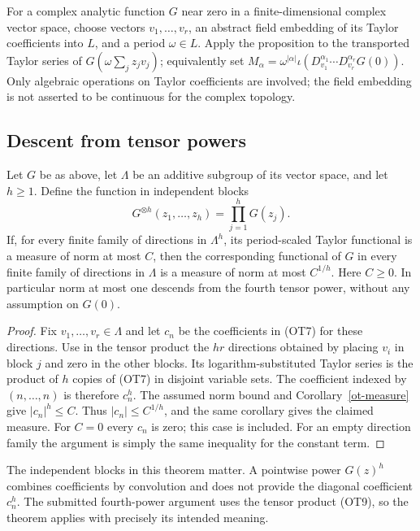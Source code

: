 For a complex analytic function $G$ near zero in a finite-dimensional
complex vector space, choose vectors $v_1,\ldots,v_r$, an abstract
field embedding of its Taylor coefficients into $L$, and a period
$\omega\in L$.  Apply the proposition to the transported Taylor
series of $G(\omega\sum_j z_jv_j)$; equivalently set
$M_\alpha=\omega^{|\alpha|}\iota(D_{v_1}^{\alpha_1}
\cdots D_{v_r}^{\alpha_r}G(0))$.
Only algebraic operations on Taylor coefficients are involved; the
field embedding is not asserted to be continuous for the complex
topology.

\subsection{Descent from tensor powers}

\begin{theorem}\label{ot-tensor-root}
Let $G$ be as above, let $\Lambda$ be an additive subgroup of its
vector space, and let $h\ge1$.  Define the function in independent
blocks
\[
             G^{\otimes h}(z_1,\ldots,z_h)
                      =\prod_{j=1}^hG(z_j).
 \tag{OT9}
\]
If, for every finite family of directions in $\Lambda^h$, its
period-scaled Taylor functional is a measure of norm at most $C$,
then the corresponding functional of $G$ in every finite family
of directions in $\Lambda$ is a measure of norm at most $C^{1/h}$.
Here $C\ge0$.  In particular norm at most one descends from the
fourth tensor power, without any assumption on $G(0)$.
\end{theorem}
\begin{proof}
Fix $v_1,\ldots,v_r\in\Lambda$ and let $c_n$ be the coefficients
in (OT7) for these directions.  Use in the tensor product the
$hr$ directions obtained by placing $v_i$ in block $j$ and zero
in the other blocks.  Its logarithm-substituted Taylor series is
the product of $h$ copies of (OT7) in disjoint variable sets.
The coefficient indexed by $(n,\ldots,n)$ is therefore $c_n^h$.
The assumed norm bound and Corollary~\ref{ot-measure} give
$|c_n|^h\le C$.  Thus $|c_n|\le C^{1/h}$, and the same
corollary gives the claimed measure.  For $C=0$ every $c_n$ is
zero; this case is included.  For an empty direction family the
argument is simply the same inequality for the constant term.
\end{proof}

The independent blocks in this theorem matter.  A pointwise power
$G(z)^h$ combines coefficients by convolution and does not provide
the diagonal coefficient $c_n^h$.  The submitted fourth-power
argument uses the tensor product (OT9), so the theorem applies
with precisely its intended meaning.

